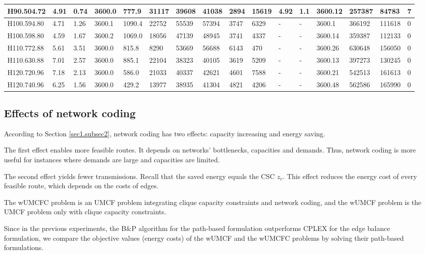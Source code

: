 \begin{table}
{\begin{tabular}{*{1}{l}|*{9}{l}|*{6}{l}}
        H90.504.72  &4.91&0.74&3600.0&777.9&31117&39608&41038&2894&15619&4.92&1.1&3600.12&257387&84783&7  \\
      \midrule
          H100.594.80  &4.71&1.26&3600.1&1090.4&22752&55539&57394&3747&6329&-&-&3600.1&366192&111618&0  \\
        H100.598.80 &4.59&1.67&3600.2&1069.0&18056&47139&48945&3741&4337&-&-&3600.14&359387&112133&0 \\
      \midrule
        H110.772.88 &5.61&3.51&3600.0&815.8&8290&53669&56688&6143&470&-&-&3600.26&630648&156050&0  \\
        H110.630.88 &7.01&2.57&3600.0&885.1&22104&38323&40105&3619&5209&-&-&3600.13&397273&130245&0  \\
      \midrule
        H120.720.96  &7.18&2.13&3600.0&586.0&21033&40337&42621&4601&7588&-&-&3600.21&542513&161613&0  \\
        H120.740.96  &6.25&1.56&3600.0&429.2&13977&38935&41304&4821&4206&-&-&3600.48&562586&165990&0 \\
      \bottomrule
     \end{tabular}}%
    \label{exph}%
\end{table}%

\subsection{Effects of network coding}
According to Section \ref{sec1.subsec2}, network coding has two effects: capacity increasing and energy saving.

The first effect enables more feasible routes. It depends on networks' bottlenecks, capacities and demands. Thus, network coding is more useful for instances where demands are large and capacities are limited.

The second effect yields fewer transmissions. Recall that the saved energy equals the CSC \(z_c\). This effect reduces the energy cost of every feasible route, which depends on the costs of edges.


The wUMCFC problem is an UMCF problem integrating clique capacity constraints and network coding, and the wUMCF problem is the UMCF problem only with clique capacity constraints.

Since in the previous experiments, the B\(\&\)P algorithm for the path-based formulation outperforms CPLEX for the edge balance formulation, we compare the objective values (energy costs) of the wUMCF and the wUMCFC problems by solving their path-based formulations.

